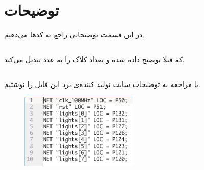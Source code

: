 \documentclass[dvipsnames, svgnames, x11names, a4paper, 11pt]{article}
\begin{document}
\section{توضیحات}
در این قسمت توضیحاتی راجع به کد‌ها می‌دهیم.

\subsection{}
که قبلا توضیح داده شده و تعداد کلاک 
را به عدد
تبدیل می‌کند.
\newpage
\subsection{}
با مراجعه به توضیحات سایت تولید کننده‌ی برد این فایل را نوشتیم.
\begin{figure}[H]
\begin{center}
\includegraphics[width=0.5\textwidth, height=0.23\textheight]{./images/ucf}
\end{center}
\end{figure}

\subsection{}
\end{document}
